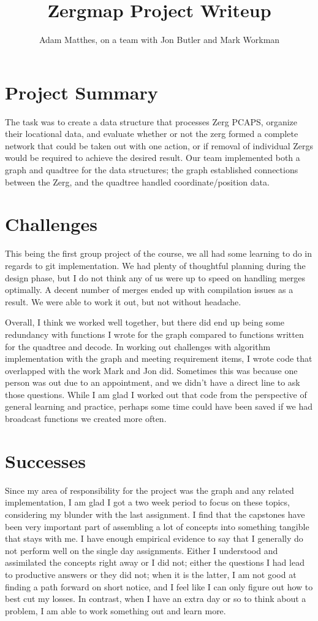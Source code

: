 \documentclass{article}
\title{Zergmap Project Writeup}
\author{Adam Matthes, on a team with Jon Butler and Mark Workman}
\begin{document}
\maketitle


\section{Project Summary}
The task was to create a data structure that processes Zerg PCAPS, organize their locational data, and evaluate whether or not the zerg formed a complete network that could be taken out with one action, or if removal of individual Zergs would be required to achieve the desired result. Our team implemented both a graph and quadtree for the data structures; the graph established connections between the Zerg, and the quadtree handled coordinate/position data.   

\section{Challenges}

This being the first group project of the course, we all had some learning to do in regards to git implementation. We had plenty of thoughtful planning during the design phase, but I do not think any of us were up to speed on handling merges optimally. A decent number of merges ended up with compilation issues as a result. We were able to work it out, but not without headache.

Overall, I think we worked well together, but there did end up being some redundancy with functions I wrote for the graph compared to functions written for the quadtree and decode. In working out challenges with algorithm implementation with the graph and meeting requirement items, I wrote code that overlapped with the work Mark and Jon did. Sometimes this was because one person was out due to an appointment, and we didn't have a direct line to ask those questions. While I am glad I worked out that code from the perspective of general learning and practice, perhaps some time could have been saved if we had broadcast functions we created more often. 

\section{Successes}
Since my area of responsibility for the project was the graph and any related implementation, I am glad I got a two week period to focus on these topics, considering my blunder with the last assignment. I find that the capstones have been very important part of assembling a lot of concepts into something tangible that stays with me. I have enough empirical evidence to say that I generally do not perform well on the single day assignments. Either I understood and assimilated the concepts right away or I did not; either the questions I had lead to productive answers or they did not; when it is the latter, I am not good at finding a path forward on short notice, and I feel like I can only figure out how to best cut my losses. In contrast, when I have an extra day or so to think about a problem, I am able to work something out and learn more.
\end{document}
